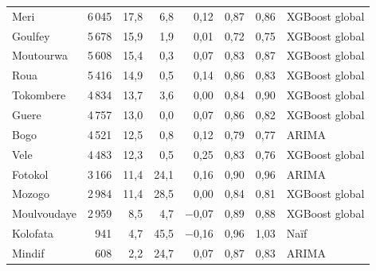 \begin{table}[!htbp]
\begin{tabular}{@{}lrrrrrrl@{}}
Meri & 6\,045 & 17,8 & 6,8 & 0,12 & 0,87 & 0,86 & XGBoost global \\
Goulfey & 5\,678 & 15,9 & 1,9 & 0,01 & 0,72 & 0,75 & XGBoost global \\
Moutourwa & 5\,608 & 15,4 & 0,3 & 0,07 & 0,83 & 0,87 & XGBoost global \\
Roua & 5\,416 & 14,9 & 0,5 & 0,14 & 0,86 & 0,83 & XGBoost global \\
Tokombere & 4\,834 & 13,7 & 3,6 & 0,00 & 0,84 & 0,90 & XGBoost global \\
Guere & 4\,757 & 13,0 & 0,0 & 0,07 & 0,86 & 0,82 & XGBoost global \\
Bogo & 4\,521 & 12,5 & 0,8 & 0,12 & 0,79 & 0,77 & ARIMA \\
Vele & 4\,483 & 12,3 & 0,5 & 0,25 & 0,83 & 0,76 & XGBoost global \\
Fotokol & 3\,166 & 11,4 & 24,1 & 0,16 & 0,90 & 0,96 & ARIMA \\
Mozogo & 2\,984 & 11,4 & 28,5 & 0,00 & 0,84 & 0,81 & XGBoost global \\
Moulvoudaye & 2\,959 & 8,5 & 4,7 & $-$0,07 & 0,89 & 0,88 & XGBoost global \\
Kolofata & 941 & 4,7 & 45,5 & $-$0,16 & 0,96 & 1,03 & Naïf \\
Mindif & 608 & 2,2 & 24,7 & 0,07 & 0,87 & 0,83 & ARIMA \\
\bottomrule\end{tabular}
\end{table}

